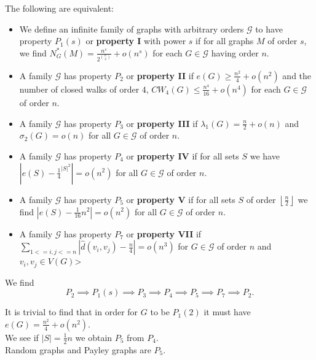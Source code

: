 \begin{definition}
	The following are equivalent:
	\begin{itemize}
		\item We define an infinite family of graphs with arbitrary orders \(\mathscr{G}\) to have property \(P_1\left( s \right) \) or  \textbf{property I} with power \(s\) if for all graphs \(M\) of order \(s\), we find \(N_{G}^{*}\left( M \right) = \frac{n^{s}}{2^{\binom{n}{2}}} + o\left( n^{s} \right) \) for each \(G \in \mathscr{G}\) having order \(n\).
		\item A family \(\mathscr{G}\) has property \(P_2\) or \textbf{property II} if \(e\left( G \right)  \ge \frac{n^2}{4} + o\left( n^2 \right) \) and the number of closed walks of order \(4\), \(CW_4 \left( G \right) \le \frac{n^{4}}{16}+ o\left( n^{4} \right) \) for each \(G \in \mathscr{G}\) of order \(n\).
		\item A family \(\mathscr{G}\) has property \(P_3\) or \textbf{property III} if \(\lambda_1\left( G \right) = \frac{n}{2} + o\left( n \right) \) and \(\sigma_2\left( G \right)  = o\left( n \right) \) for all \(G \in \mathscr{G}\) of order \(n\).
		\item A family \(\mathscr{G}\) has property \(P_4\) or \textbf{property IV} if for all sets \(S\) we have \(\left| e\left( S \right) - \frac{1}{4}^{\left| S \right| ^2} \right| = o\left( n^2 \right) \) for all \(G \in \mathscr{G}\) of order \(n\).
		\item A family \(\mathscr{G}\) has property \(P_5\) or \textbf{property V} if for all sets \(S\) of order \(\left\lfloor \frac{n}{2} \right\rfloor\) we find \(\left| e\left( S \right) - \frac{1}{16}n^2 \right|  = o\left( n^2 \right) \) for all \(G \in \mathscr{G}\) of order \(n\).
		\item A family \(\mathscr{G}\) has property \(P_7\) or \textbf{property VII} if \(\sum_{1 <= i, j <= n}^{} \left| \hat{d}\left( v_{i}, v_{j} \right) - \frac{n}{4} \right| = o\left( n^3 \right) \) for \(G \in \mathscr{G}\) of order \(n\) and \(v_{i}, v_{j} \in V\left( G \right) \)>
	\end{itemize}
	We find \[
		P_2 \implies P_1\left( s \right) \implies P_3 \implies P_4 \implies P_5 \implies P_7 \implies P_2
	.\]
\end{definition}
\begin{example}
	It is trivial to find that in order for \(G\) to be \(P_1\left( 2 \right) \) it must have \(e\left( G \right)  = \frac{n^2}{4} + o\left( n^2 \right) \).\\
	We see if \(\left| S \right| =\frac{1}{2}n\) we obtain \(P_5\) from \(P_4\).\\
Random graphs and Payley graphs are \(P_5\).
\end{example}
